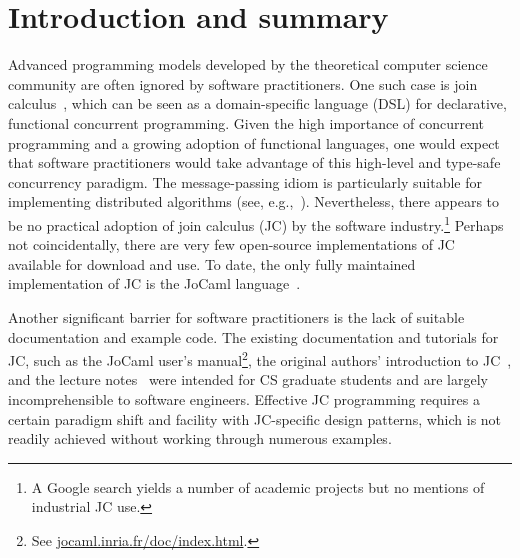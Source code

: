 \documentclass[sigplan,10pt,review,anonymous]{acmart}\settopmatter{printfolios=true}
\begin{document}


\maketitle


\section{Introduction and summary}

Advanced programming models developed by the theoretical computer
science community are often ignored by software practitioners. One
such case is join calculus~\citep{FouGon1996}, which can be
seen as a domain-specific language (DSL) for declarative, functional
concurrent programming. Given the high importance of concurrent programming
and a growing adoption of functional languages, one would expect that
software practitioners would take advantage of this high-level and
type-safe concurrency paradigm. The message-passing idiom is particularly
suitable for implementing distributed algorithms (see, e.g.,~\citep{BarEA2007}).
Nevertheless, there appears to be no practical adoption of join calculus (JC) by the
software industry.\footnote{ A Google search yields a number of academic projects but no mentions
of industrial JC use.} Perhaps not coincidentally, there are very few open-source implementations
of JC available for download and use. To date, the only fully maintained
implementation of JC is the JoCaml language~\citep{FouEA2003}.

Another significant barrier for software practitioners is the lack
of suitable documentation and example code. The existing documentation
and tutorials for JC, such as the JoCaml user's manual\footnote{ See \href{http://jocaml.inria.fr/doc/index.html}{jocaml.inria.fr/doc/index.html}.},
the original authors' introduction to JC~\citep{FouGon2000}, and
the lecture notes~\citep{FouEA2003} were intended for CS graduate students
and are largely incomprehensible to software engineers.
Effective JC programming requires a certain paradigm shift and facility
with JC-specific design patterns, which is not readily achieved without
working through numerous examples.
\end{document}

